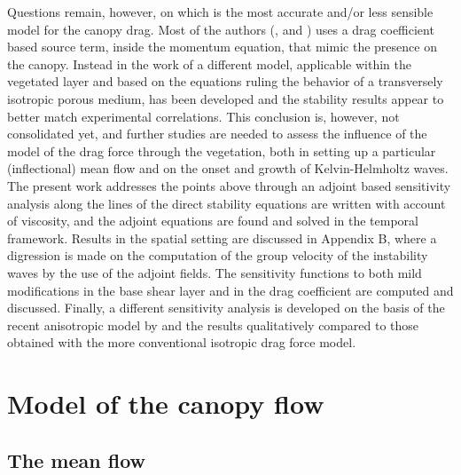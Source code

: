 Questions remain, however, on which is the most accurate and/or less sensible model for the canopy drag. Most of the authors (\citet{raupach1996coherent}, \citet{py2004mixing} and \citet{singh2016linear}) uses a drag coefficient based source term, inside the momentum equation, that mimic the presence on the canopy. Instead in the work of \citet{zampogna2016instability} a different model, applicable within the vegetated layer and
based on the equations ruling the behavior of a transversely isotropic porous medium, has been
developed and the stability results appear to better match experimental correlations. This conclusion
is, however, not consolidated yet, and further studies are needed to assess the influence of the model
of the drag force through the vegetation, both in setting up a particular (inflectional) mean flow and
on the onset and growth of Kelvin-Helmholtz waves.
The present work addresses the points above through an adjoint based sensitivity analysis along
the lines of \citet{bottaro2003effect} the direct stability equations are written with account of viscosity, and
the adjoint equations are found and solved in the temporal framework. Results in the spatial setting
are discussed in Appendix B, where a digression is made on the computation of the group velocity
of the instability waves by the use of the adjoint fields. The sensitivity functions to both mild
modifications in the base shear layer and in the drag coefficient are computed and discussed. Finally,
a different sensitivity analysis is developed on the basis of the recent anisotropic model by \citet{zampogna2016instability} and the results qualitatively compared to those obtained with the more conventional
isotropic drag force model.



\section{Model of the canopy flow}
\label{sec:2ch3}

\subsection{The mean flow}

